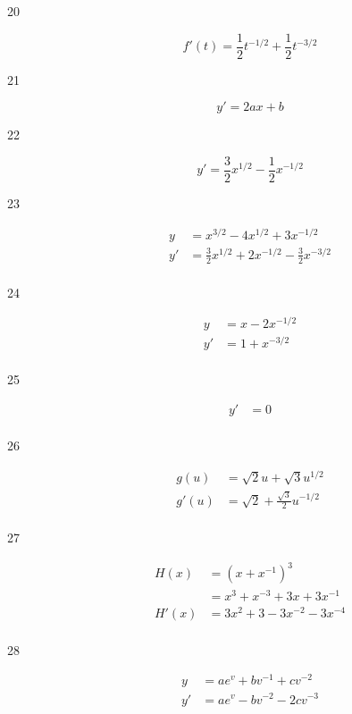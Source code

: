 \documentclass[letterpaper, landscape]{exam}
\begin{document}
\begin{description}
    \item[20] 
      \[
        f'(t) = \boxed{ \frac{1}{2} t^{-1/2} + \frac{1}{2} t^{-3/2} } 
      \]

    \item[21] 
      \[
        y' = \boxed{ 2ax + b } 
      \]

    \item[22] 
      \[
        y' = \boxed{ \frac{3}{2} x^{1/2} - \frac{1}{2} x^{-1/2} } 
      \]

    \item[23] 
      \begin{align*}
        y  & = x^{3/2} - 4x^{1/2} + 3x^{-1/2} \\
        y' & = \boxed{ \frac{3}{2}x^{1/2} + 2x^{-1/2} - \frac{3}{2} x^{-3/2} } \\
      \end{align*}

    \item[24] 
      \begin{align*}
        y  & = x - 2x^{-1/2} \\
        y' & = \boxed{ 1 + x^{-3/2} } \\
      \end{align*}

    \item[25] 
      \begin{align*}
        y' & = \boxed{ 0 } \\
      \end{align*}

    \item[26] 
      \begin{align*}
        g(u)  & = \sqrt{2} u + \sqrt{3} u^{1/2} \\
        g'(u) & = \boxed{\sqrt{2} + \frac{\sqrt{3}}{2} u^{-1/2}} \\
      \end{align*}

    \item[27] 
      \begin{align*}
        H(x)  & = \left(x + x^{-1} \right)^3 \\
              & = x^3 + x^{-3} + 3x + 3x^{-1} \\
        H'(x) & = \boxed{ 3x^2 + 3 - 3x^{-2} - 3x^{-4} } \\
      \end{align*}

    \item[28] 
      \begin{align*}
        y  & = ae^v + bv^{-1} + cv^{-2} \\
        y' & = \boxed{ ae^v - bv^{-2} - 2cv^{-3} } \\
      \end{align*}


\end{description}
\end{document}
